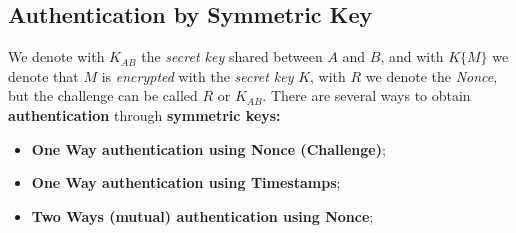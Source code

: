 \documentclass{article}
\begin{document}
\subsection{Authentication by Symmetric Key}
We denote with $K_{AB}$ the \emph{secret key} shared between $A$ and $B$, and with $K\{M\}$ we denote that $M$ is \emph{encrypted} with the \emph{secret key} $K$, with $R$ we denote the \emph{Nonce}, but the challenge can be called $R$ or $K_{AB}$. There are several ways to obtain \textbf{authentication} through \textbf{symmetric keys:}
\begin{itemize}
\item \textbf{One Way authentication using Nonce (Challenge)};
\item \textbf{One Way authentication using Timestamps};
\item \textbf{Two Ways (mutual) authentication using Nonce};
\end{itemize}
\end{document}
